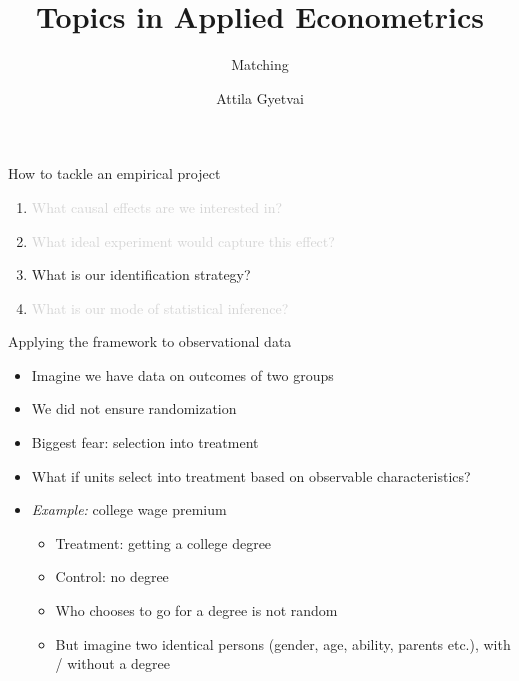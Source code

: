 \documentclass[aspectratio=169,compress,handout,t,xcolor=table]{beamer}
\title{Topics in Applied Econometrics}
\subtitle[]{Matching}
\author[Attila Gyetvai]{Attila Gyetvai}
\institute[]{Duke Economics \\ Summer 2020}
\date{}
\begin{document}
{
\begin{frame}
  \titlepage
\end{frame}
}
\addtocounter{framenumber}{-1}

\begin{frame}[c]{How to tackle an empirical project}
  \begin{enumerate}
    \addtolength{\itemsep}{0.5\baselineskip}
    \item \textcolor{lightgray}{What causal effects are we interested in?}
    \item \textcolor{lightgray}{What ideal experiment would capture this effect?}
    \item What is our identification strategy?
    \item \textcolor{lightgray}{What is our mode of statistical inference?}
  \end{enumerate}
\end{frame}

\begin{frame}{Applying the framework to observational data}
  \begin{itemize}
    \item Imagine we have data on outcomes of two groups
    \item We did not ensure randomization
    \item Biggest fear: selection into treatment
    \item What if units select into treatment based on observable characteristics?
    \item \emph{Example:} college wage premium
    \begin{itemize}
      \item Treatment: getting a college degree
      \item Control: no degree
      \item Who chooses to go for a degree is not random
      \item But imagine two identical persons (gender, age, ability, parents etc.), with / without a degree
    \end{itemize}
  \end{itemize}
\end{frame}
\end{document}
